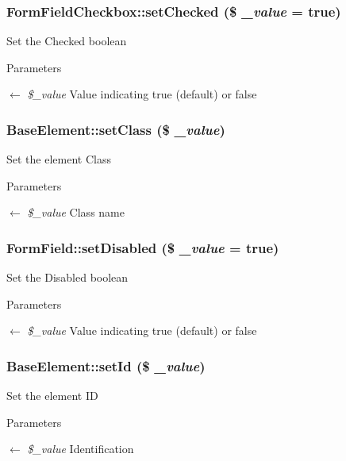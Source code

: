 \subsubsection[{setChecked}]{\setlength{\rightskip}{0pt plus 5cm}FormFieldCheckbox::setChecked (\$ {\em \_\-value} = {\ttfamily true})}\label{classFormFieldCheckbox_a944623b7e1136bab6dd9880980037425}
Set the Checked boolean 
\begin{DoxyParams}{Parameters}
\item[\mbox{$\leftarrow$} {\em \$\_\-value}]Value indicating true (default) or false \end{DoxyParams}
\subsubsection[{setClass}]{\setlength{\rightskip}{0pt plus 5cm}BaseElement::setClass (\$ {\em \_\-value})}\label{classBaseElement_af6597b30fa9798878f6290271043dfa2}
Set the element Class 
\begin{DoxyParams}{Parameters}
\item[\mbox{$\leftarrow$} {\em \$\_\-value}]Class name \end{DoxyParams}
\subsubsection[{setDisabled}]{\setlength{\rightskip}{0pt plus 5cm}FormField::setDisabled (\$ {\em \_\-value} = {\ttfamily true})}\label{classFormField_a9fa2c828eaf98154edfaa2e755657117}
Set the Disabled boolean 
\begin{DoxyParams}{Parameters}
\item[\mbox{$\leftarrow$} {\em \$\_\-value}]Value indicating true (default) or false \end{DoxyParams}
\subsubsection[{setId}]{\setlength{\rightskip}{0pt plus 5cm}BaseElement::setId (\$ {\em \_\-value})}\label{classBaseElement_a0c1ce3d1684ecb78960cf7a97278494e}
Set the element ID 
\begin{DoxyParams}{Parameters}
\item[\mbox{$\leftarrow$} {\em \$\_\-value}]Identification \end{DoxyParams}

